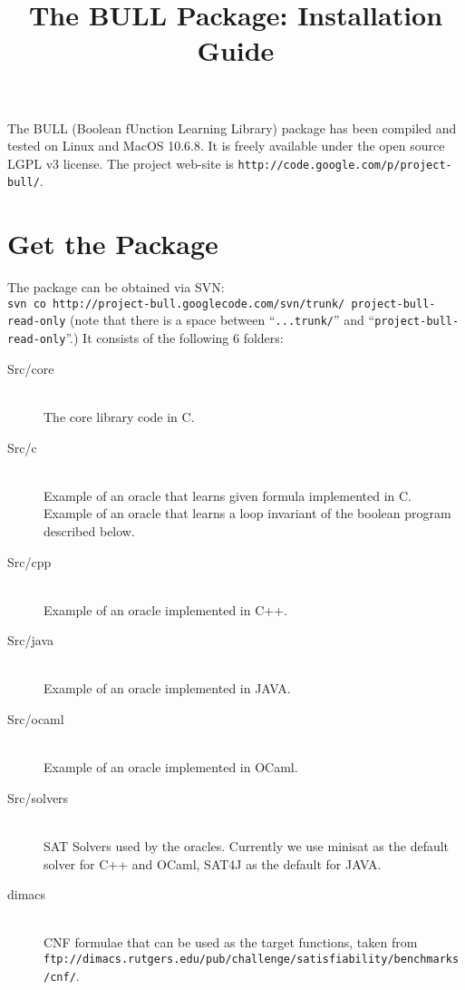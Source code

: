 \documentclass{article}
\title{The BULL Package: Installation Guide }
\begin{document}
\maketitle
The BULL (Boolean fUnction Learning Library) package has been compiled and tested on Linux and MacOS 10.6.8. It is freely available under the open source LGPL v3 license. The project web-site is \verb"http://code.google.com/p/project-bull/".
 

\section{Get the Package}

The package can be obtained via SVN:\\
\verb"svn co http://project-bull.googlecode.com/svn/trunk/ project-bull-read-only" (note that there is a space between ``\verb"...trunk/"'' and  ``\verb"project-bull-read-only"''.)
It consists of the following 6 folders:
\begin{description}
\item[Src/core]\ \\ 
The core library code in C.
\item [Src/c]\ \\ 
Example of an oracle that learns given formula implemented in C.
Example of an oracle that learns a loop invariant of the boolean program described below.
\item [Src/cpp]\ \\ 
Example of an oracle implemented in C++.
\item [Src/java]\ \\ 
Example of an oracle implemented in JAVA.
\item [Src/ocaml]\ \\ 
Example of an oracle implemented in OCaml.
\item [Src/solvers]\ \\ 
SAT Solvers used by the oracles. Currently we use minisat as the default solver for C++ and OCaml, SAT4J as the default for JAVA.
\item [dimacs]\ \\
CNF formulae that can be used as the target functions, taken from\\ \verb"ftp://dimacs.rutgers.edu/pub/challenge/satisfiability/benchmarks/cnf/".
\end{description}
\end{document}
